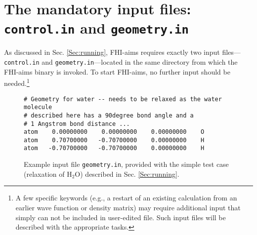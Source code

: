 \section{The mandatory input files: \texttt{control.in} and \texttt{geometry.in}}

As discussed in Sec. \ref{Sec:running}, FHI-aims requires exactly two input
files---\texttt{control.in} and \texttt{geometry.in}---located in
the same directory from which the FHI-aims binary is invoked. To start
FHI-aims, no further input should be needed.\footnote{A few specific keywords
  (e.g., a restart of an existing calculation from an earlier wave function
  or density matrix) may require
  additional input that simply can not be included in user-edited file. Such
  input files will be described with the appropriate tasks.}

\begin{figure}
  \small
  \begin{verbatim}
# Geometry for water -- needs to be relaxed as the water molecule 
# described here has a 90degree bond angle and a 
# 1 Angstrom bond distance ... 
atom    0.00000000    0.00000000    0.00000000    O
atom    0.70700000   -0.70700000    0.00000000    H 
atom   -0.70700000   -0.70700000    0.00000000    H 
  \end{verbatim}
  \normalsize
  \caption{\label{Fig:geometry.in}
    Example input file \texttt{geometry.in}, provided with the simple
    test case (relaxation of H$_2$O) described in Sec. \ref{Sec:running}.
  }
\end{figure}

